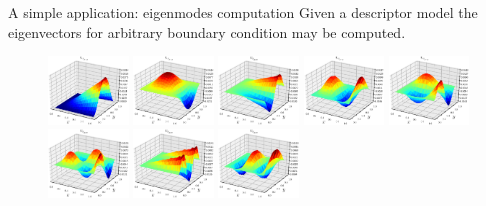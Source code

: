 \documentclass[aspectratio=169]{ISAE-Beamer}
\begin{document}
\begin{frame}{A simple application: eigenmodes computation}
Given a descriptor model the eigenvectors for arbitrary boundary condition may be computed.
\begin{figure}
	\includegraphics[width=0.19\textwidth]{EigenvectorsM/Eig_1.eps} 
	\includegraphics[width=0.19\textwidth]{EigenvectorsM/Eig_2.eps}
	\includegraphics[width=0.19\textwidth]{EigenvectorsM/Eig_3.eps}  
	\includegraphics[width=0.19\textwidth]{EigenvectorsM/Eig_4.eps} 
	\includegraphics[width=0.19\textwidth]{EigenvectorsM/Eig_5.eps}
	\includegraphics[width=0.19\textwidth]{EigenvectorsM/Eig_6.eps} 
	\includegraphics[width=0.19\textwidth]{EigenvectorsM/Eig_7.eps}
	\includegraphics[width=0.19\textwidth]{EigenvectorsM/Eig_8.eps}  

\end{figure}
\end{frame}
\end{document}
